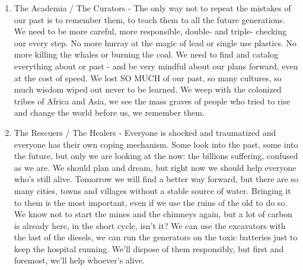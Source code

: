 \begin{enumerate}
\item The Academia / The Curators - The only way not to repeat the mistakes of our past is to remember them, to teach them to all the future generations. We need to be more careful, more responsible, double- and triple- checking our every step. No more hurray at the magic of lead or single use plastics. No more killing the whales or burning the coal. We need to find and catalog everything about or past - and be very mindful about our plans forward, even at the cost of speed. We lost SO MUCH of our past, so many cultures, so much wisdom wiped out never to be learned. We weep with the colonized tribes of Africa and Asia, we see the mass graves of people who tried to rise and change the world before us, we remember them.

\item The Rescuers / The Healers - Everyone is shocked and traumatized and everyone has their own coping mechanism. Some look into the past, some into the future, but only we are looking at the now: the billions suffering, confused as we are. We should plan and dream, but right now we should help everyone who's still alive. Tomorrow we will find a better way forward, but there are so many cities, towns and villages without a stable source of water. Bringing it to them is the most important, even if we use the ruins of the old to do so. We know not to start the mines and the chimneys again, but a lot of carbon is already here, in the short cycle, isn't it? We can use the excavators with the last of the diesels, we can run the generators on the toxic batteries just to keep the hospital running. We'll dispose of them responsibly, but first and foremost, we'll help whoever's alive.

\end{enumerate}